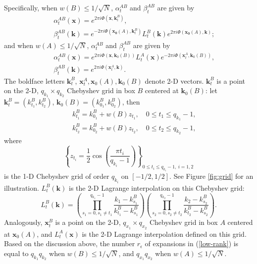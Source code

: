 Specifically, when $w(B)\leq1/\sqrt{N}$, $\alpha_t^{AB}$ and $\beta_t^{AB}$ are given by
\begin{eqnarray} 
&&\alpha_t^{AB}(\mathbf{x})=e^{2\pi i
  \Phi(\mathbf{x},\mathbf{k}_t^B)}, \label{expan1a} \\
&&\beta_t^{AB}(\mathbf{k})=e^{-2\pi i
  \Phi(\mathbf{x_0}(A),\mathbf{k}_t^B)}L_t^B(\mathbf{k}) e^{2\pi i
  \Phi(\mathbf{x_0}(A),\mathbf{k})}; \label{expan1b}
\end{eqnarray}
and when $w(A)\leq1/\sqrt{N}$, $\alpha_t^{AB}$ and $\beta_t^{AB}$ are given by
\begin{eqnarray} 
&&\alpha_t^{AB}(\mathbf{x})=e^{2\pi i
  \Phi(\mathbf{x},\mathbf{k}_0(B))}L_t^A(\mathbf{x}) e^{-2\pi i
  \Phi(\mathbf{x}_t^A,\mathbf{k}_0(B))},   \label{expan2a} \\
&&\beta_t^{AB}(\mathbf{k})=e^{2\pi i
  \Phi(\mathbf{x}_t^A,\mathbf{k})}. \label{expan2b}
\end{eqnarray}
The boldface letters $\mathbf{k}_t^B$, $\mathbf{x}_t^A, \mathbf{x}_0(A), \mathbf{k}_0(B)$ denote 2-D vectors. $\mathbf{k}_t^B$ is a point on the 2-D, $q_{k_1}\times q_{k_2}$ Chebyshev grid in box $B$ centered at $\mathbf{k}_0(B)$: let $\mathbf{k}_t^B=(k_{t_1}^B,k_{t_2}^B)$, $\mathbf{k}_0(B)=(k_{0_1}^B,k_{0_2}^B)$, then
\begin{eqnarray}
&&k_{t_1}^B=k_{0_1}^B+w(B)z_{t_1}, \quad 0\leq t_1 \leq q_{k_1}-1, \\
&&k_{t_2}^B=k_{0_2}^B+w(B)z_{t_2}, \quad 0\leq t_2 \leq q_{k_2}-1,
\end{eqnarray}
where 
\begin{equation}
\left\{z_{t_i}=\frac{1}{2}\cos\left( \frac{\pi t_i}{q_{k_i}-1}\right)\right\}_{0\leq t_i\leq
  q_{k_i}-1,\  i=1,2}
\end{equation}
is the 1-D Chebyshev grid of order $q_{k_i}$ on $[-1/2,1/2]$. See Figure \ref{fig:grid} for an illustration. $L_t^B(\mathbf{k})$ is the 2-D Lagrange interpolation on this Chebyshev grid:
\begin{equation}
L_t^B(\mathbf{k})=\left(\prod_{s_1=0, s_1\neq t_1}^{ q_{k_1}-1}\frac{k_1-k_{s_1}^B}{k_{t_1}^B-k_{s_1}^B}   \right)
\left(\prod_{s_2=0, s_2\neq t_2}^{
    q_{k_2}-1}\frac{k_2-k_{s_2}^B}{k_{t_2}^B-k_{s_2}^B}
\right).
\end{equation}
Analogously, $\mathbf{x}_t^B$ is a point on the 2-D, $q_{x_1}\times q_{x_2}$ Chebyshev grid in box $A$ centered at $\mathbf{x}_0(A)$, and $L_t^A(\mathbf{x})$ is the 2-D Lagrange interpolation defined on this grid. Based on the discussion above, the number  $r_{\epsilon}$ of expansions in (\ref{low-rank}) is equal to $q_{k_1}q_{k_2}$ when $w(B)\leq 1/\sqrt{N}$, and $q_{x_1}q_{x_2}$ when $w(A)\leq 1/\sqrt{N}$.

